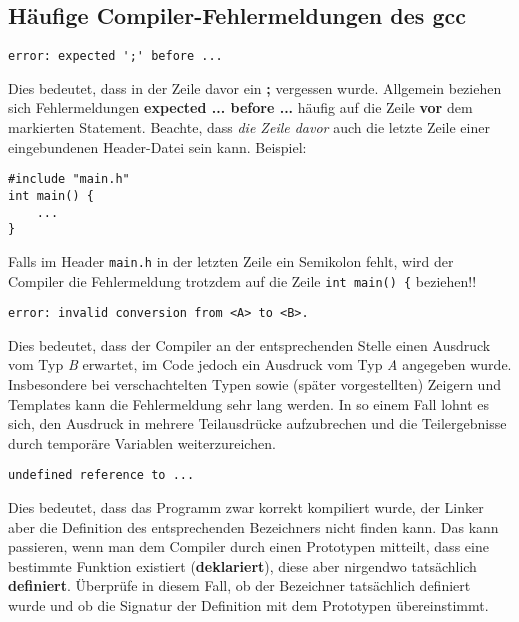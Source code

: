 
\subsection*{Häufige Compiler-Fehlermeldungen des gcc}

\begin{verbatim}
error: expected ';' before ...
\end{verbatim}

Dies bedeutet, dass in der Zeile davor ein \textbf{;} vergessen wurde.
Allgemein beziehen sich Fehlermeldungen \textbf{expected ... before ...} häufig auf die Zeile \textbf{vor} dem markierten Statement.
Beachte, dass \emph{die Zeile davor} auch die letzte Zeile einer eingebundenen Header-Datei sein kann. Beispiel:

\begin{lstlisting}
#include "main.h"
int main() {
	...
}
\end{lstlisting}

Falls im Header \texttt{main.h} in der letzten Zeile ein Semikolon fehlt, wird der Compiler die Fehlermeldung trotzdem auf die Zeile \texttt{int main() \{} beziehen!!

\begin{verbatim}
error: invalid conversion from <A> to <B>.
\end{verbatim}

Dies bedeutet, dass der Compiler an der entsprechenden Stelle einen Ausdruck vom Typ \emph{B} erwartet, im Code jedoch ein Ausdruck vom Typ \emph{A} angegeben wurde. Insbesondere bei verschachtelten Typen sowie (später vorgestellten) Zeigern und Templates kann die Fehlermeldung sehr lang werden. In so einem Fall lohnt es sich, den Ausdruck in mehrere Teilausdrücke aufzubrechen und die Teilergebnisse durch temporäre Variablen weiterzureichen.

\begin{verbatim}
undefined reference to ...
\end{verbatim}

Dies bedeutet, dass das Programm zwar korrekt kompiliert wurde, der Linker aber die Definition des entsprechenden Bezeichners nicht finden kann.
Das kann passieren, wenn man dem Compiler durch einen Prototypen mitteilt, dass eine bestimmte Funktion existiert (\textbf{deklariert}), diese aber nirgendwo tatsächlich \textbf{definiert}.
Überprüfe in diesem Fall, ob der Bezeichner tatsächlich definiert wurde und ob die Signatur der Definition mit dem Prototypen übereinstimmt.
